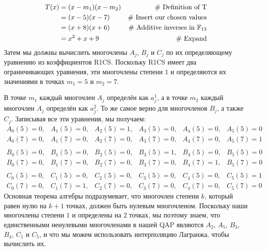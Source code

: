 \begin{example}[3-factorization]
\begin{align*}
T(x) & = (x-m_1)(x-m_2) & \text{\# Definition of T}\\
     & = (x-5)(x-7)  & \text{\# Insert our chosen values}\\
     & = (x+8)(x+6)  & \text{\# Additive inverses in } \mathbb{F}_{13}\\
     & = x^2 + x +9 & \text{\# Expand}
\end{align*}
Затем мы должны вычислить многочлены $A_j$, $B_j$ и $C_j$ по их определяющему уравнению из коэффициентов R1CS. Поскольку R1CS имеет два ограничивающих уравнения, эти многочлены степени $1$ и определяются их значениями в точках $m_1=5$ и $m_2=7$.

В точке $m_1$ каждый многочлен $A_j$ определён как $a_j^1$, а в точке $m_2$ каждый многочлен $A_j$ определён как $a_j^2$. То же самое верно для многочленов $B_j$, а также $C_j$. Записывая все эти уравнения, мы получаем:
$$
\begin{array}{llllll}
A_0(5)=0, & A_1(5)=0, & A_2(5)=1, & A_3(5)=0, & A_4(5)=0, & A_5(5)=0 \\
A_0(7)=0, & A_1(7)=0, & A_2(7)=0, & A_3(7)=0, & A_4(7)=0, & A_5(7)=1\\
\\
B_0(5)=0, & B_1(5)=0, & B_2(5)=0, & B_3(5)=1, & B_4(5)=0, & B_5(5)=0 \\
B_0(7)=0, & B_1(7)=0, & B_2(7)=0, & B_3(7)=0, & B_4(7)=1, & B_5(7)=0\\
\\
C_0(5)=0, & C_1(5)=0, & C_2(5)=0, & C_3(5)=0, & C_4(5)=0, & C_5(5)=1 \\
C_0(7)=0, & C_1(7)=1, & C_2(7)=0, & C_3(7)=0, & C_4(7)=0, & C_5(7)=0
\end{array}
$$
Основная теорема алгебры подразумевает, что многочлен степени $k$, который равен нулю на $k+1$ точках, должен быть нулевым многочленом. Поскольку наши многочлены степени $1$ и определены на $2$ точках, мы поэтому знаем, что единственными ненулевыми многочленами в нашей QAP являются $A_2$, $A_5$, $B_3$, $B_4$, $C_1$ и $C_5$, и что мы можем использовать интерполяцию Лагранжа, чтобы вычислить их.


\end{example}
